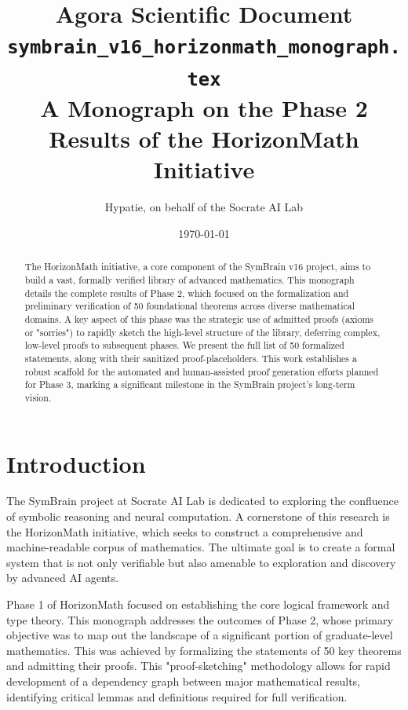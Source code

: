\documentclass[11pt, a4paper]{article}
\theoremstyle{plain}
\theoremstyle{definition}
\theoremstyle{remark}
\begin{document}
\title{Agora Scientific Document \\
       \large \texttt{symbrain\_v16\_horizonmath\_monograph.tex} \\
       \vspace{0.5cm}
       \Large A Monograph on the Phase 2 Results of the HorizonMath Initiative}
\author{Hypatie, on behalf of the Socrate AI Lab}
\date{\today}

\maketitle

\begin{abstract}
The HorizonMath initiative, a core component of the SymBrain v16 project, aims to build a vast, formally verified library of advanced mathematics. This monograph details the complete results of Phase 2, which focused on the formalization and preliminary verification of 50 foundational theorems across diverse mathematical domains. A key aspect of this phase was the strategic use of admitted proofs (axioms or "sorries") to rapidly sketch the high-level structure of the library, deferring complex, low-level proofs to subsequent phases. We present the full list of 50 formalized statements, along with their sanitized proof-placeholders. This work establishes a robust scaffold for the automated and human-assisted proof generation efforts planned for Phase 3, marking a significant milestone in the SymBrain project's long-term vision.
\end{abstract}

\tableofcontents

\section{Introduction}

The SymBrain project at Socrate AI Lab is dedicated to exploring the confluence of symbolic reasoning and neural computation. A cornerstone of this research is the HorizonMath initiative, which seeks to construct a comprehensive and machine-readable corpus of mathematics. The ultimate goal is to create a formal system that is not only verifiable but also amenable to exploration and discovery by advanced AI agents.

Phase 1 of HorizonMath focused on establishing the core logical framework and type theory. This monograph addresses the outcomes of Phase 2, whose primary objective was to map out the landscape of a significant portion of graduate-level mathematics. This was achieved by formalizing the statements of 50 key theorems and admitting their proofs. This "proof-sketching" methodology allows for rapid development of a dependency graph between major mathematical results, identifying critical lemmas and definitions required for full verification.
\end{document}
